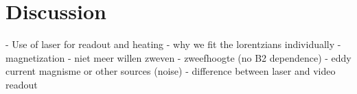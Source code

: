 \chapter{Discussion}
\label{chap:discussion}
- Use of laser for readout and heating
- why we fit the lorentzians individually
- magnetization
- niet meer willen zweven
- zweefhoogte (no B2 dependence)
- eddy current magnisme or other sources (noise)
- difference between laser and video readout
